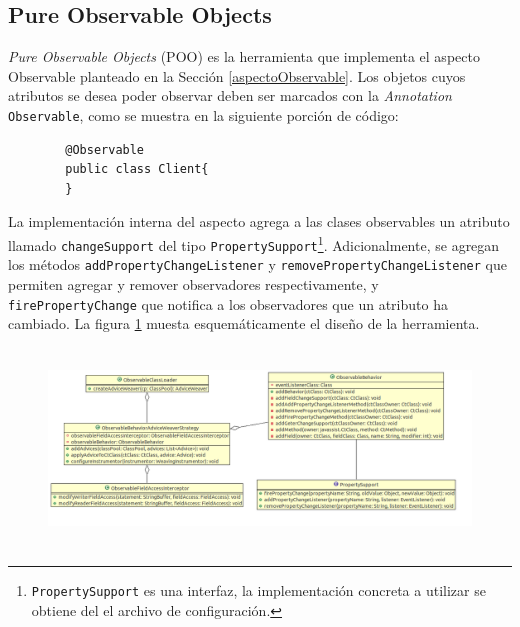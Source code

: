 \subsection{Pure Observable Objects}
	\label{poo}
	\emph{Pure Observable Objects} (POO) es la herramienta que implementa el
	aspecto Observable planteado en la Sección \ref{aspectoObservable}.
	Los objetos cuyos atributos se desea poder observar deben ser marcados con
	la \emph{Annotation} \lstinline|Observable|, como
	se muestra en la siguiente porción de código:
	
	\begin{lstlisting} 
		@Observable
		public class Client{
		}
	\end{lstlisting}
	
	La implementación interna del aspecto agrega a las clases observables un
	atributo llamado \lstinline|changeSupport| del tipo
	\lstinline|PropertySupport|\footnote{\lstinline|PropertySupport| es una
	interfaz, la implementación concreta a utilizar se obtiene del el archivo de
	configuración.}.
	Adicionalmente, se agregan los métodos 
	\lstinline|addPropertyChangeListener| y
	\lstinline|removePropertyChangeListener| que permiten agregar 
	y remover observadores respectivamente, y \lstinline|firePropertyChange|
	que notifica a los observadores que un atributo ha cambiado.
	La figura \ref{fig:poo} muesta
	esquemáticamente el diseño de la herramienta.
	
	\begin{figure}[h]
		\includegraphics[width=450px, height=200px]{img/poo}
	 	\label{fig:poo}
	 	\caption{}
	\end{figure}
	